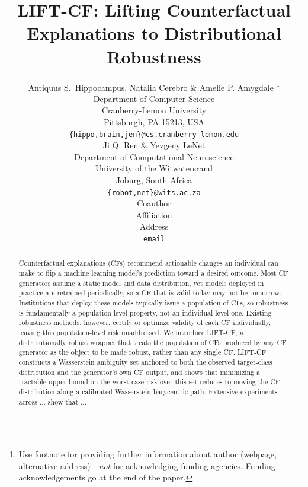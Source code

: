 \documentclass{article} %
\title{\textsc{LIFT-CF}: Lifting Counterfactual \\ Explanations to Distributional Robustness}
\author{Antiquus S.~Hippocampus, Natalia Cerebro \& Amelie P. Amygdale \thanks{ Use footnote for providing further information
about author (webpage, alternative address)---\emph{not} for acknowledging
funding agencies.  Funding acknowledgements go at the end of the paper.} \\
Department of Computer Science\\
Cranberry-Lemon University\\
Pittsburgh, PA 15213, USA \\
\texttt{\{hippo,brain,jen\}@cs.cranberry-lemon.edu} \\
\And
Ji Q. Ren \& Yevgeny LeNet \\
Department of Computational Neuroscience \\
University of the Witwatersrand \\
Joburg, South Africa \\
\texttt{\{robot,net\}@wits.ac.za} \\
\AND
Coauthor \\
Affiliation \\
Address \\
\texttt{email}
}
\theoremstyle{remark}
\begin{document}
\maketitle

\begin{abstract}
Counterfactual explanations (CFs) recommend actionable changes an individual can make to flip a machine learning model's prediction toward a desired outcome. 
Most CF generators assume a static model and data distribution, yet models deployed in practice are retrained periodically, so a CF that is valid today may not be tomorrow. 
Institutions that deploy these models typically issue a population of CFs, so  robustness is fundamentally a population-level property, not an individual-level one.
Existing robustness methods, however, certify or optimize validity of each CF individually, leaving this population-level risk unaddressed.
We introduce \textsc{LIFT-CF}, a distributionally robust wrapper that treats the population of CFs produced by any CF generator as the object to be made robust, rather than any single CF. 
\textsc{LIFT-CF} constructs a Wasserstein ambiguity set anchored to both the observed target-class distribution and the generator's own CF output, and shows that minimizing a tractable upper bound on the worst-case risk over this set reduces to moving the CF distribution along a calibrated Wasserstein barycentric path. \textcolor{latte_maroon}{Extensive experiments across ... show that ...}
\end{abstract}











\end{document}
